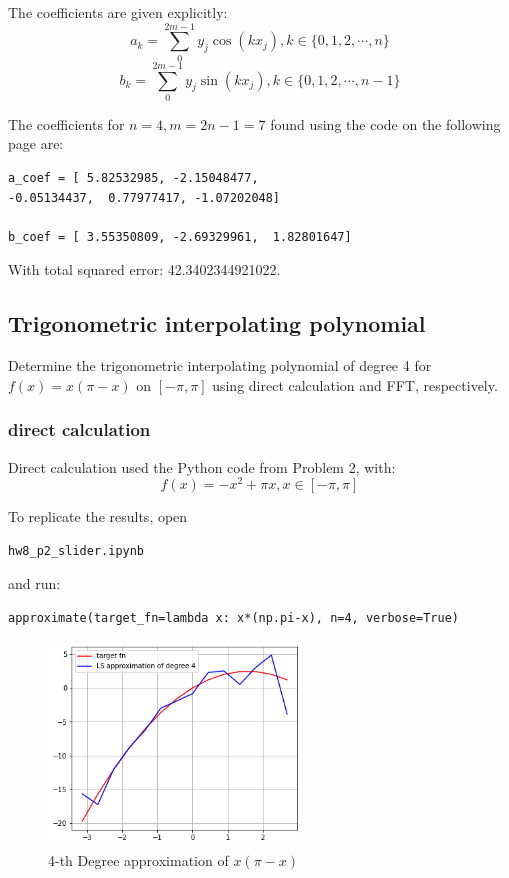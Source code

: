 \documentclass[12pt]{article} %
\newcommand{\1}[1]{\mathds{1}\left[#1\right]}
\begin{document}
The coefficients are given explicitly:
$$
	a_k = \sum_{0}^{2m-1}y_j\cos(kx_j), k\in \{0,1, 2,\cdots, n\}
$$
$$
	b_k = \sum_{0}^{2m-1}y_j\sin(kx_j), k\in \{0,1, 2,\cdots, n-1\}
$$

The coefficients for $n=4, m=2n-1=7$ found using the code on the following page are:
\begin{verbatim}
a_coef = [ 5.82532985, -2.15048477, 
-0.05134437,  0.77977417, -1.07202048]

b_coef = [ 3.55350809, -2.69329961,  1.82801647]
\end{verbatim}

With total squared error: 42.3402344921022.


 


\subsection{Trigonometric interpolating polynomial}
Determine the trigonometric interpolating polynomial of degree 4 for $f(x) = x(\pi - x)$ on $[-\pi,\pi]$ using direct calculation and FFT, respectively.
\subsubsection{direct calculation}
Direct calculation used the Python code from Problem 2, with:
$$
	f(x) = -x^2 + \pi x, x\in [-\pi,\pi]
$$

To replicate the results, open 
\begin{verbatim}
hw8_p2_slider.ipynb
\end{verbatim} and run:
\begin{verbatim}
approximate(target_fn=lambda x: x*(np.pi-x), n=4, verbose=True)
\end{verbatim}

\begin{figure}[h]
\caption{4-th Degree approximation of $x(\pi -x)$}
\centering
\includegraphics[width=0.6\textwidth]{p3_direct.png}
\end{figure}
\end{document}
